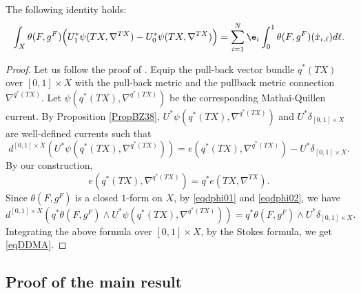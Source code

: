 \begin{prop}\label{propBZVVa}
The following identity holds:
\begin{equation}\label{eqDDMA}
\int_{X}\theta(F,g^{F})
\Big(U_{1}^{*}\psi(TX,\nabla^{TX})-
U_{0}^{*}\psi(TX,\nabla^{TX})\Big)
=\sum_{i=1}^{N}\e_{i}\int_{0}^{1}\theta(F,g^{F})(\dot{x}_{i,\ell})d\ell.
\end{equation}
\end{prop}
\begin{proof}
Let us follow the proof of \cite[Prop.\,6.1, Prop.\,6.4]{BZ92}. Equip the pull-back vector bundle
$q^{*}(TX)$ over $[0,1]\times X$ with the pull-back metric and the pullback metric
connection $\nabla^{q^{*}(TX)}$. Let
$\psi(q^{*}(TX),\nabla^{q^{*}(TX)})$ be the corresponding
Mathai-Quillen current. By Proposition \ref{PropBZ38},
$U^{*}\psi(q^{*}(TX),\nabla^{q^{*}(TX)})$ and
$U^{*}\delta_{[0,1]\times X}$ are well-defined currents such that
\begin{equation}\label{eqdphi01}
d^{[0,1]\times X} (
U^{*}\psi(q^{*}(TX),\nabla^{q^{*}(TX)}))=e(q^{*}(TX),\nabla^{q^{*}(TX)})-U^{*}\delta_{[0,1]\times X}.
\end{equation}
By our construction,
\begin{equation}\label{eqdphi02}
e(q^{*}(TX),\nabla^{q^{*}(TX)})=q^{*}e(TX,\nabla^{TX}).
\end{equation}
Since $\theta(F,g^{F})$ is a closed $1$-form on $X$, by
\eqref{eqdphi01} and \eqref{eqdphi02}, we have
\begin{equation*}
d^{[0,1]\times X} (q^{*}\theta(F,g^{F}) \wedge
U^{*}\psi(q^{*}(TX),\nabla^{q^{*}(TX)}))
=q^{*}\theta(F,g^{F}) \wedge U^{*}\delta_{[0,1]\times X}.
\end{equation*}
Integrating the above formula over $[0,1]\times X$, by the Stokes
formula, we get \eqref{eqDDMA}.
\end{proof}

\subsection{Proof of the main result}\label{s33}

